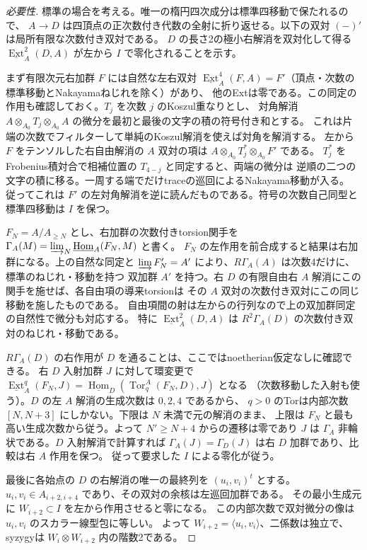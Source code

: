 \begin{proof}[必要性]
標準の場合を考える。唯一の楕円四次成分は標準四移動で保たれるので、
$A\to D$ は四頂点の正次数付き代数の全射に折り返せる。以下の双対 $(-)'$ は局所有限な次数付き双対である。
$D$ の長さ2の極小右解消を双対化して得る
$\underline{\operatorname{Ext}}_A^2(D,A)$ が左から $I$ で零化されることを示す。

まず有限次元右加群 $F$ には自然な左右双対
$\underline{\operatorname{Ext}}_A^4(F,A)=F'$（頂点・次数の標準移動とNakayamaねじれを除く）があり、
他のExtは零である。この同定の作用も確認しておく。$T_j$ を次数 $j$ のKoszul重なりとし、
対角解消 $A\otimes_{A_0}T_j\otimes_{A_0}A$ の微分を最初と最後の文字の積の符号付き和とする。
これは片端の次数でフィルターして単純のKoszul解消を使えば対角を解消する。
左から $F$ をテンソルした右自由解消の $A$ 双対の項は
$A\otimes_{A_0}T_j^*\otimes_{A_0} F'$ である。
$T_j^*$ をFrobenius積対合で相補位置の $T_{4-j}$ と同定すると、両端の微分は
逆順の二つの文字の積に移る。一周する端でだけtraceの巡回によるNakayama移動が入る。
従ってこれは $F'$ の左対角解消を逆に読んだものである。符号の次数自己同型と標準四移動は $I$ を保つ。

$F_N=A/A_{\ge N}$ とし、右加群の次数付きtorsion関手を
$\Gamma_A(M)=\varinjlim_N\underline{\operatorname{Hom}}_A(F_N,M)$ と書く。
$F_N$ の左作用を前合成すると結果は右加群になる。上の自然な同定と
$\varinjlim F_N'=A'$ により、$R\Gamma_A(A)$ は次数4だけに、標準のねじれ・移動を持つ
双加群 $A'$ を持つ。右 $D$ の有限自由右 $A$ 解消にこの関手を施せば、各自由項の導来torsionは
その $A$ 双対の次数付き双対にこの同じ移動を施したものである。
自由項間の射は左からの行列なので上の双加群同定の自然性で微分も対応する。
特に $\underline{\operatorname{Ext}}_A^2(D,A)$ は $R^2\Gamma_A(D)$ の次数付き双対のねじれ・移動である。

$R\Gamma_A(D)$ の右作用が $D$ を通ることは、ここではnoetherian仮定なしに確認できる。
右 $D$ 入射加群 $J$ に対して環変更で
$\underline{\operatorname{Ext}}_A^q(F_N,J)
=\underline{\operatorname{Hom}}_D(\operatorname{Tor}_q^A(F_N,D),J)$ となる
（次数移動した入射も使う）。$D$ の左 $A$ 解消の生成次数は $0,2,4$ であるから、
$q>0$ のTorは内部次数 $[N,N+3]$ にしかない。下限は $N$ 未満で元の解消のまま、
上限は $F_N$ と最も高い生成次数から従う。よって $N'\ge N+4$ からの遷移は零であり
$J$ は $\Gamma_A$ 非輪状である。$D$ 入射解消で計算すれば
$\Gamma_A(J)=\Gamma_D(J)$ は右 $D$ 加群であり、比較は右 $A$ 作用を保つ。
従って要求した $I$ による零化が従う。

最後に各始点の $D$ の右解消の唯一の最終列を $(u_i,v_i)^t$ とする。
$u_i,v_i\in A_{i+2,i+4}$ であり、その双対の余核は左巡回加群である。
その最小生成元に $W_{i+2}\subset I$ を左から作用させると零になる。
この内部次数で双対微分の像は $u_i,v_i$ のスカラー線型包に等しい。
よって $W_{i+2}=\langle u_i,v_i\rangle$、二係数は独立で、syzygyは $W_i\otimes W_{i+2}$ 内の階数2である。
\end{proof}

